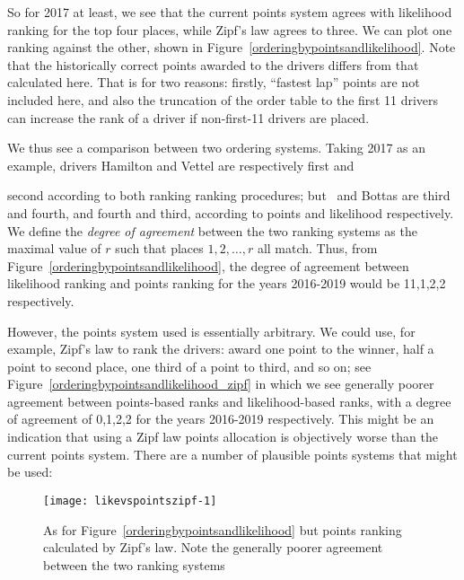 \documentclass[a4,12pt]{article}
\begin{document}
\noindent So for 2017 at least, we see that the current points system
agrees with likelihood ranking for the top four places, while Zipf's
law agrees to three.  We can plot one ranking against the other, shown
in Figure~\ref{orderingbypointsandlikelihood}.  Note that the
historically correct points awarded to the drivers differs from that
calculated here.  That is for two reasons: firstly, ``fastest lap''
points are not included here, and also the truncation of the order
table to the first 11 drivers can increase the rank of a driver if
non-first-11 drivers are placed.

We thus see a comparison between two ordering systems.  Taking 2017 as
an example, drivers Hamilton and Vettel are respectively first and

second according to both ranking ranking procedures; but \raik\ and
Bottas are third and fourth, and fourth and third, according to points
and likelihood respectively. We define the \emph{degree of agreement}
between the two ranking systems as the maximal value of \(r\) such
that places \(1,2,\ldots, r\) all match.  Thus, from
Figure~\ref{orderingbypointsandlikelihood}, the degree of agreement
between likelihood ranking and points ranking for the years 2016-2019
would be 11,1,2,2 respectively.

However, the points system used is essentially arbitrary.  We could
use, for example, Zipf's law to rank the drivers: award one point to
the winner, half a point to second place, one third of a point to
third, and so on; see Figure~\ref{orderingbypointsandlikelihood_zipf}
in which we see generally poorer agreement between points-based ranks
and likelihood-based ranks, with a degree of agreement of 0,1,2,2 for
the years 2016-2019 respectively.  This might be an indication that
using a Zipf law points allocation is objectively worse than the
current points system.  There are a number of plausible points systems
that might be used:

\begin{figure}
{\centering \texttt{[image: likevspointszipf-1]}}
\caption[\doublespacing As for
  Figure~\ref{orderingbypointsandlikelihood} \label{orderingbypointsandlikelihood_zipf}
  but points ranking calculated by Zipf's law]{\doublespacing As for
  Figure~\ref{orderingbypointsandlikelihood} \label{orderingbypointsandlikelihood_zipf}
  but points ranking calculated by Zipf's law. Note the generally
  poorer agreement between the two ranking
  systems}\label{fig:likevspointszipf}
\end{figure}
\end{document}
